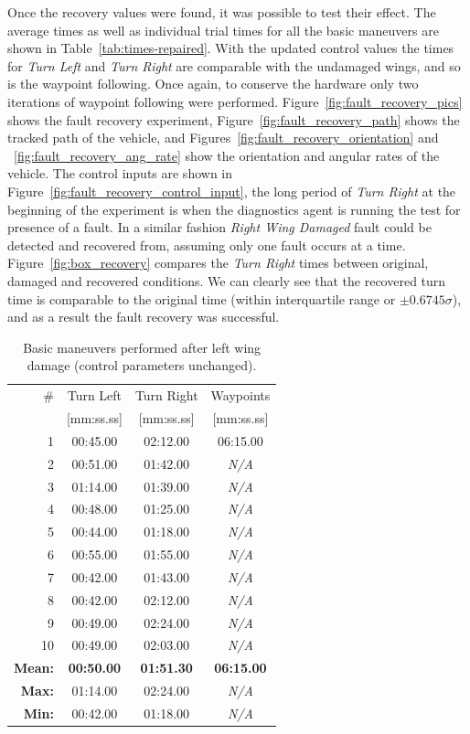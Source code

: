 Once the recovery values were found, it was possible to test their effect. The average times as well as individual trial times for all the basic maneuvers are shown in Table~\ref{tab:times-repaired}. With the updated control values the times for \textit{Turn Left} and \textit{Turn Right} are comparable with the undamaged wings, and so is the waypoint following. Once again, to conserve the hardware only two iterations of waypoint following were performed. Figure~\ref{fig:fault_recovery_pics} shows the fault recovery experiment, Figure~\ref{fig:fault_recovery_path} shows the tracked path of the vehicle, and Figures~\ref{fig:fault_recovery_orientation} and ~\ref{fig:fault_recovery_ang_rate} show the orientation and angular rates of the vehicle. The control inputs are shown in Figure~\ref{fig:fault_recovery_control_input}, the long period of \textit{Turn Right} at the beginning of the experiment is when the diagnostics agent is running the test for presence of a fault. In a similar fashion \textit{Right Wing Damaged} fault could be detected and recovered from, assuming only one fault occurs at a time. Figure~\ref{fig:box_recovery} compares the \textit{Turn Right} times between original, damaged and recovered conditions. We can clearly see that the recovered turn time is comparable to the original time (within interquartile range or $\pm0.6745\sigma$), and as a result the fault recovery was successful.

\begin{table}
\centering
\renewcommand{\arraystretch}{1.0}
\begin{tabular}{rccc}
\hline
\# & Turn Left & Turn Right & Waypoints\\
 & [mm:ss.ss] & [mm:ss.ss] & [mm:ss.ss]\\
\hline
\rowcolor{Gray}
1 & 00:45.00 & 02:12.00 & 06:15.00\\
2 & 00:51.00 & 01:42.00 & \textit{N/A}\\
\rowcolor{Gray}
3 & 01:14.00 & 01:39.00 & \textit{N/A}\\
4 & 00:48.00 & 01:25.00 & \textit{N/A}\\
\rowcolor{Gray}
5 & 00:44.00 & 01:18.00 & \textit{N/A}\\
6 & 00:55.00 & 01:55.00 & \textit{N/A}\\
\rowcolor{Gray}
7 & 00:42.00 & 01:43.00 & \textit{N/A}\\
8 & 00:42.00 & 02:12.00 & \textit{N/A}\\
\rowcolor{Gray}
9 & 00:49.00 & 02:24.00 & \textit{N/A}\\
10 & 00:49.00 & 02:03.00 & \textit{N/A}\\
\hline
\textbf{Mean:} & \textbf{00:50.00} & \textbf{01:51.30} & \textbf{06:15.00}\\
\textbf{Max:} & 01:14.00 & 02:24.00 & \textit{N/A}\\
\textbf{Min:} & 00:42.00 & 01:18.00 & \textit{N/A}\\
\hline
\end{tabular}
\newline
\caption[Basic maneuvers performed after wing damage]{Basic maneuvers performed after left wing damage (control parameters unchanged).}
\label{tab:times-damaged}
\end{table}



